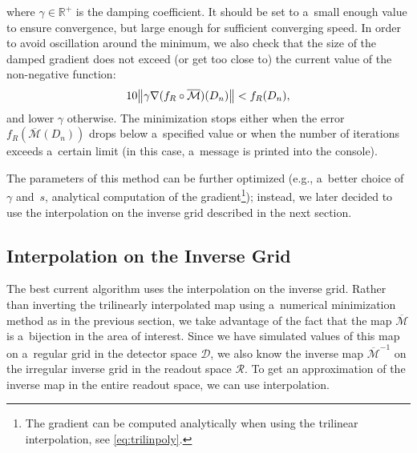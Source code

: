 			where $\gamma\in\mathbb{R}^+$ is the damping coefficient. It should be set to a~small enough value to ensure convergence, but large enough for sufficient converging speed. In order to avoid oscillation around the minimum, we also check that the size of the damped gradient does not exceed (or get too close to) the current value of the non-negative function:
				\begin{equation}
					10 \norm{\gamma \nabla(f_R\circ\overline{\mathcal{M}})(D_n)} < f_R(D_n),
				\end{equation}
			and lower $\gamma$ otherwise. The minimization stops either when the error $f_R(\overline{\mathcal{M}}(D_n))$ drops below a~specified value or when the number of iterations exceeds a~certain limit (in this case, a~message is printed into the console).
			
			The parameters of this method can be further optimized (e.g., a~better choice of $\gamma$ and~$s$, analytical computation of the gradient\footnote{The gradient can be computed analytically when using the trilinear interpolation, see \cref{eq:trilinpoly}.}); instead, we later decided to use the interpolation on the inverse grid described in the next section.
			
		
		\subsection{Interpolation on the Inverse Grid}
		\label{sec:interpol}			
			The best current algorithm uses the interpolation on the inverse grid. Rather than inverting the trilinearly interpolated map using a~numerical minimization method as in the previous section, we take advantage of the fact that the map $\overline{\mathcal{M}}$ is a~bijection in the area of interest. Since we have simulated values of this map on a~regular grid in the detector space $\mathcal{D}$, we also know the inverse map $\overline{\mathcal{M}}^{-1}$ on the irregular inverse grid in the readout space $\mathcal{R}$. To get an approximation of the inverse map in the entire readout space, we can use interpolation.
			
